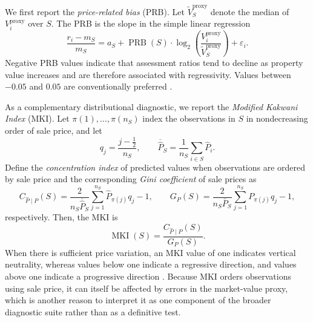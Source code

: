 \documentclass[10pt]{article}
\theoremstyle{definition}
\newcommand{\1}{\mathbf{1}}
\begin{document}
{We first report the \textit{price-related bias} (PRB).}
Let $\widetilde V_S^{\mathrm{proxy}}$ denote the median of $V_i^{\mathrm{proxy}}$ over $S$. The PRB is the slope in the simple linear regression
\begin{equation}
\label{eq:prb}
\frac{r_i-m_S}{m_S}
=
a_S
+
\operatorname{PRB}(S)\cdot
\log_2\left(
\frac{V_i^{\mathrm{proxy}}}
{\widetilde V_S^{\mathrm{proxy}}}
\right)
+
\varepsilon_i.
\end{equation}
Negative PRB values indicate that assessment ratios tend to decline as property value increases and are therefore associated with regressivity. Values between $-0.05$ and $0.05$ are conventionally preferred \cite{IAAO2013Ratio}.

{As a complementary distributional diagnostic, we report the \emph{Modified Kakwani Index} (MKI). Let $\pi(1),\allowbreak\ldots,\pi(n_S)$ index the observations in $S$ in nondecreasing order of sale price, and let
\[
q_j=\frac{j-\tfrac12}{n_S},
\qquad
\overline{\widehat P}_S
=
\frac{1}{n_S}\sum_{i\in S}\widehat P_i.
\]
Define the \emph{concentration index} of predicted values when observations are ordered by sale price and the corresponding \emph{Gini coefficient} of sale prices as
\begin{equation}
\label{eq:mki_components}
C_{\widehat P\mid P}(S)
=
\frac{2}{n_S\overline{\widehat P}_S}
\sum_{j=1}^{n_S}
\widehat P_{\pi(j)}q_j
-1,
\qquad 
G_P(S)
=
\frac{2}{n_S\bar P_S}
\sum_{j=1}^{n_S}
P_{\pi(j)}q_j
-1,
\end{equation}
respectively. Then, the MKI is
\begin{equation}
\label{eq:mki}
\operatorname{MKI}(S)
=
\frac{C_{\widehat P\mid P}(S)}{G_P(S)}.
\end{equation}
When there is sufficient price variation, an MKI value of one indicates vertical neutrality, whereas values below one indicate a regressive direction, and values above one indicate a progressive direction \cite{IAAO2026ExposureRatio}. Because MKI orders observations using sale price, it can itself be affected by errors in the market-value proxy, which is another reason to interpret it as one component of the broader diagnostic suite rather than as a definitive test.}
\end{document}

